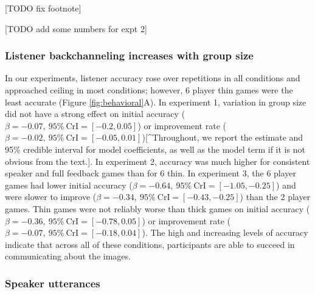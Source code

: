 \documentclass[
  english,
  a4paper,
]{article}
\begin{document}
{[}TODO fix footnote{]}

{[}TODO add some numbers for expt 2{]}

\hypertarget{listener-backchanneling-increases-with-group-size}{%
\subsubsection{Listener backchanneling increases with group size}\label{listener-backchanneling-increases-with-group-size}}

In our experiments, listener accuracy rose over repetitions in all conditions and approached ceiling in most conditions; however, 6 player thin games were the least accurate (Figure \ref{fig:behavioral}A). In experiment 1, variation in group size did not have a strong effect on initial accuracy (\(\beta=-0.07,\:95\%\:\mathrm{CrI}=[-0.2, 0.05]\)) or improvement rate (\(\beta=-0.02,\:95\%\:\mathrm{CrI}=[-0.05, 0.01]\)){[}\^{}Throughout, we report the estimate and 95\% credible interval for model coefficients, as well as the model term if it is not obvious from the text.{]}. In experiment 2, accuracy was much higher for consistent speaker and full feedback games than for 6 thin. In experiment 3, the 6 player games had lower initial accuracy (\(\beta=-0.64,\:95\%\:\mathrm{CrI}=[-1.05, -0.25]\)) and were slower to improve (\(\beta=-0.34,\:95\%\:\mathrm{CrI}=[-0.43, -0.25]\)) than the 2 player games. Thin games were not reliably worse than thick games on initial accuracy (\(\beta=-0.36,\:95\%\:\mathrm{CrI}=[-0.78, 0.05]\)) or improvement rate (\(\beta=-0.07,\:95\%\:\mathrm{CrI}=[-0.18, 0.04]\)). The high and increasing levels of accuracy indicate that across all of these conditions, participants are able to succeed in communicating about the images.

\hypertarget{speaker-utterances}{%
\subsubsection{Speaker utterances}\label{speaker-utterances}}
\end{document}
